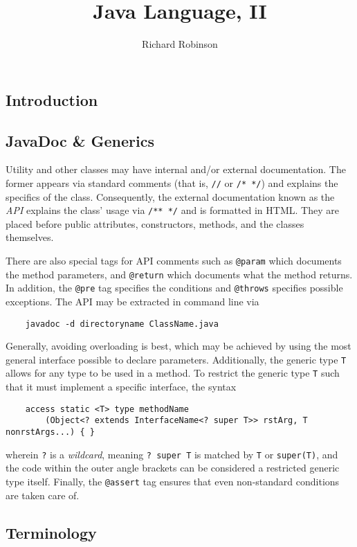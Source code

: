 \documentclass[letterpaper, openany, justified]{tufte-book}
\title{Java Language, II}
\author{Richard Robinson}
\newcommand{\cd}[1]{\lstinline{#1}}
\begin{document}
\maketitle
\tableofcontents
\setlength{\parindent}{0pt}
\begin{fullwidth}

\chapter{Introduction}

\section{JavaDoc \& Generics}

Utility and other classes may have internal and/or external documentation. The former appears via standard comments (that is, \cd{//} or \cd{/* */}) and explains the specifics of the class. Consequently, the external documentation known as the \emph{API} explains the class' usage via \cd{/** */} and is formatted in HTML. They are placed before public attributes, constructors, methods, and the classes themselves.

\bigskip
There are also special tags for API comments such as \cd{@param} which documents the method parameters, and \cd{@return} which documents what the method returns. In addition, the \cd{@pre} tag specifies the conditions and \cd{@throws} specifies possible exceptions. The API may be extracted in command line via
\begin{lstlisting}
    javadoc -d directoryname ClassName.java
\end{lstlisting}
Generally, avoiding overloading is best, which may be achieved by using the most general interface possible to declare parameters. Additionally, the generic type \cd{T} allows for any type to be used in a method. To restrict the generic type \cd{T} such that it must implement a specific interface, the syntax
\begin{lstlisting}
    access static <T> type methodName
        (Object<? extends InterfaceName<? super T>> rstArg, T nonrstArgs...) { }
\end{lstlisting}
wherein \cd{?} is a \emph{wildcard}, meaning \cd{? super T} is matched by \cd{T} or \cd{super(T)}, and the code within the outer angle brackets can be considered a restricted generic type itself. Finally, the \cd{@assert} tag ensures that even non-standard conditions are taken care of.

\section{Terminology}


\end{fullwidth}
\end{document}
